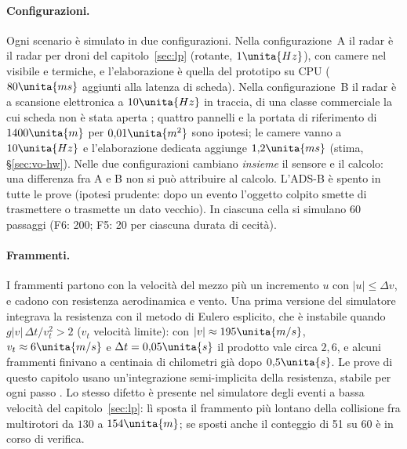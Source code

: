 \paragraph{Configurazioni.} Ogni scenario è simulato in due configurazioni. Nella configurazione~A il radar è il radar per droni del capitolo~\ref{sec:lp} (rotante, $1\unita{Hz}$), con camere nel visibile e termiche, e l'elaborazione è quella del prototipo su CPU ($80\unita{ms}$ aggiunti alla latenza di scheda). Nella configurazione~B il radar è a scansione elettronica a $10\unita{Hz}$ in traccia, di una classe commerciale la cui scheda non è stata aperta \citep{DA_VERIFICARE:echodyne-echoshield}; quattro pannelli e la portata di riferimento di $1400\unita{m}$ per $0{,}01\unita{m^2}$ sono ipotesi; le camere vanno a $10\unita{Hz}$ e l'elaborazione dedicata aggiunge $1{,}2\unita{ms}$ (stima, \S\ref{sec:vo-hw}). Nelle due configurazioni cambiano \emph{insieme} il sensore e il calcolo: una differenza fra A e B non si può attribuire al calcolo. L'ADS-B è spento in tutte le prove (ipotesi prudente: dopo un evento l'oggetto colpito smette di trasmettere o trasmette un dato vecchio). In ciascuna cella si simulano 60 passaggi (F6: 200; F5: 20 per ciascuna durata di cecità).

\paragraph{Frammenti.} I frammenti partono con la velocità del mezzo più un incremento $u$ con $|u|\le\Delta v$, e cadono con resistenza aerodinamica e vento. Una prima versione del simulatore integrava la resistenza con il metodo di Eulero esplicito, che è instabile quando $g|v|\,\Delta t/v_t^2>2$ ($v_t$ velocità limite): con $|v|\approx195\unita{m/s}$, $v_t\approx6\unita{m/s}$ e $\Delta t=0{,}05\unita{s}$ il prodotto vale circa $2{,}6$, e alcuni frammenti finivano a centinaia di chilometri già dopo $0{,}5\unita{s}$. Le prove di questo capitolo usano un'integrazione semi-implicita della resistenza, stabile per ogni passo . Lo stesso difetto è presente nel simulatore degli eventi a bassa velocità del capitolo~\ref{sec:lp}: lì sposta il frammento più lontano della collisione fra multirotori da $130$ a $154\unita{m}$; se sposti anche il conteggio di 51 su 60 è in corso di verifica.

